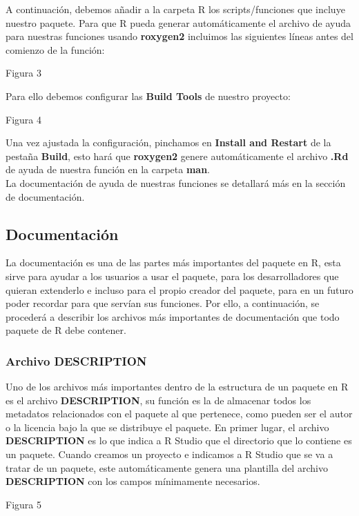 A continuaci\'on, debemos a\~nadir a la carpeta R los scripts/funciones que incluye nuestro
paquete.
Para que R pueda generar autom\'aticamente el archivo de ayuda para nuestras funciones
usando \textbf{roxygen2} incluimos las siguientes l\'ineas antes del comienzo de la funci\'on:

Figura 3

Para ello debemos configurar las \textbf{Build Tools} de nuestro proyecto:

Figura 4

Una vez ajustada la configuraci\'on, pinchamos en \textbf{Install and Restart} de la pesta\~na \textbf{Build},
esto har\'a que \textbf{roxygen2} genere autom\'aticamente el archivo \textbf{.Rd} de ayuda de nuestra funci\'on
en la carpeta \textbf{man}.\\
La documentaci\'on de ayuda de nuestras funciones se detallar\'a m\'as en la secci\'on de
documentaci\'on.

\subsection{Documentaci\'on}

La documentaci\'on es una de las partes m\'as importantes del paquete en R, esta sirve para
ayudar a los usuarios a usar el paquete, para los desarrolladores que quieran extenderlo e
incluso para el propio creador del paquete, para en un futuro poder recordar para que serv\'ian
sus funciones.
Por ello, a continuaci\'on, se proceder\'a a describir los archivos m\'as importantes de
documentaci\'on que todo paquete de R debe contener.

\subsubsection{Archivo DESCRIPTION}

Uno de los archivos m\'as importantes dentro de la estructura de un paquete en R es el archivo
\textbf{DESCRIPTION}, su funci\'on es la de almacenar todos los metadatos relacionados con el
paquete al que pertenece, como pueden ser el autor o la licencia bajo la que se distribuye el
paquete.
En primer lugar, el archivo \textbf{DESCRIPTION} es lo que indica a R Studio que el directorio que lo
contiene es un paquete. Cuando creamos un proyecto e indicamos a R Studio que se va a
tratar de un paquete, este autom\'aticamente genera una plantilla del archivo \textbf{DESCRIPTION}
con los campos m\'inimamente necesarios.

Figura 5

